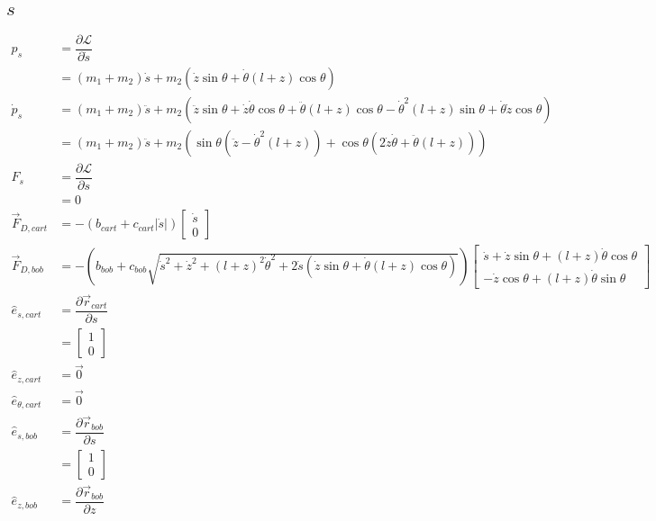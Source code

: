 \documentclass[12pt,a4paper,portrait]{article}
\newcommand{\lag}{\mathcal{L}}
\begin{document}
	\subsection{$s$}
	\begin{align*}
		p_s &= \dfrac{\partial \lag}{\partial \dot{s}} \\
		&= (m_1+m_2)\dot{s} + m_2(\dot{z}\sin{\theta} + \dot{\theta}(l+z)\cos{\theta}) \\
		\dot{p}_s &= (m_1+m_2)\ddot{s} + m_2(\ddot{z}\sin{\theta}+\dot{z}\dot{\theta}\cos{\theta}+\ddot{\theta}(l+z)\cos{\theta}-\dot{\theta}^2(l+z)\sin{\theta}+\dot{\theta}\dot{z}\cos{\theta}) \\
		&= (m_1+m_2)\ddot{s} + m_2(\sin{\theta}(\ddot{z}-\dot{\theta}^2(l+z))+\cos{\theta}(2\dot{z}\dot{\theta}+\ddot{\theta}(l+z)))\\
		F_{s} &= \dfrac{\partial \lag}{\partial s} \\
		&= 0 \\
		\vec{F}_{D,cart} &= -(b_{cart}+c_{cart}|\dot{s}|)\begin{bmatrix}
			\dot{s}\\
			0
		\end{bmatrix} \\
		\vec{F}_{D,bob} &= -(b_{bob}+c_{bob}\sqrt{\dot{s}^2 + \dot{z}^2 + (l+z)^2\dot{\theta}^2 + 2\dot{s}(\dot{z}\sin{\theta} + \dot{\theta}(l+z)\cos{\theta})})\begin{bmatrix}
			\dot{s} + \dot{z}\sin{\theta} + (l+z)\dot{\theta}\cos{\theta} \\
			-\dot{z}\cos{\theta} + (l+z)\dot{\theta}\sin{\theta}
		\end{bmatrix} \\
		\hat{e}_{s, cart} &= \dfrac{\partial \vec{r}_{cart}}{\partial s} \\
		&= \begin{bmatrix}
			1 \\
			0
		\end{bmatrix} \\
		\hat{e}_{z, cart} &= \vec{0} \\
		\hat{e}_{\theta, cart} &= \vec{0} \\
		\hat{e}_{s, bob} &= \dfrac{\partial \vec{r}_{bob}}{\partial s} \\
		&= \begin{bmatrix}
			1 \\
			0
		\end{bmatrix} \\
		\hat{e}_{z, bob} &= \dfrac{\partial \vec{r}_{bob}}{\partial z} \\

\end{align*}
\end{document}
